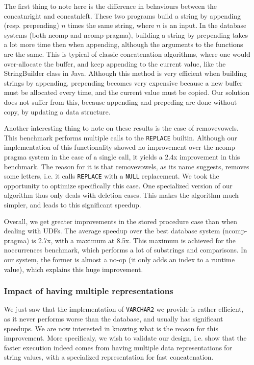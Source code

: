 \documentclass[twoside,11pt,a4paper]{article}
\newcommand{\java}[1]{\textsf{#1}}
\newcommand{\pls}[1]{\small\texttt{#1}\normalsize}
\newcommand{\plstype}[1]{\pls{#1}}
\newcommand{\varchar}{\plstype{VARCHAR2}}
\newcommand{\plsnull}{\pls{NULL}}
\newcommand{\benchsystem}[1]{\textsf{#1}}
\newcommand{\ncomp}{\benchsystem{ncomp}}
\newcommand{\ncpg}{\benchsystem{ncomp-pragma}}
\newcommand{\bench}[1]{\textsf{#1}}
\begin{document}
The first thing to note here is the difference in behaviours between the \bench{concatnright} and \bench{concatnleft}. These two programs build a string by appending (resp. prepending) $n$ times the same string, where $n$ is an input. In the database systems (both \ncomp{} and \ncpg{}), building a string by prepending takes a lot more time then when appending, although the arguments to the functions are the same. This is typical of classic concatenation algorithms, where one would over-allocate the buffer, and keep appending to the current value, like the \java{StringBuilder} class in Java. Although this method is very efficient when building strings by appending, prepending becomes very expensive because a new buffer must be allocated every time, and the current value must be copied. Our solution does not suffer from this, because appending and prepeding are done without copy, by updating a data structure.

Another interesting thing to note on these results is the case of \bench{removevowels}. This benchmark performs multiple calls to the \pls{REPLACE} builtin. Although our implementation of this functionality showed no improvement over the \ncpg{} system in the case of a single call, it yields a 2.4x improvement in this benchmark. The reason for it is that \bench{removevowels}, as its name suggests, removes some letters, i.e. it calls \pls{REPLACE} with a \plsnull{} replacement. We took the opportunity to optimize specifically this case. One specialized version of our algorithm thus only deals with deletion cases. This makes the algorithm much simpler, and leads to this significant speedup.

Overall, we get greater improvements in the stored procedure case than when dealing with UDFs. The average speedup over the best database system (\ncpg{}) is 2.7x, with a maximum at 8.5x. This maximum is achieved for the \bench{noccurrences} benchmark, which performs a lot of substrings and comparisons. In our system, the former is almost a no-op (it only adds an index to a runtime value), which explains this huge improvement.

\subsubsection{Impact of having multiple representations}

We just saw that the implementation of \varchar{} we provide is rather efficient, as it never performs worse than the database, and usually has significant speedups. We are now interested in knowing what is the reason for this improvement. More specificaly, we wish to validate our design, i.e. show that the faster execution indeed comes from having multiple data representations for string values, with a specialized representation for fast concatenation.
\end{document}

